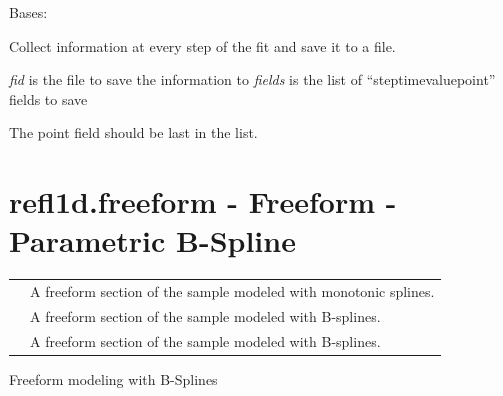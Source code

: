 \documentclass[letterpaper,10pt,english]{sphinxmanual}
\begin{document}

\begin{fulllineitems}
\label{api/fitters:refl1d.fitters.StepMonitor}
Bases: 

Collect information at every step of the fit and save it to a file.

\emph{fid} is the file to save the information to
\emph{fields} is the list of ``step\textbar{}time\textbar{}value\textbar{}point'' fields to save

The point field should be last in the list.

\begin{fulllineitems}
\label{api/fitters:refl1d.fitters.StepMonitor.config_history}
\end{fulllineitems}


\end{fulllineitems}



\section{refl1d.freeform - Freeform - Parametric B-Spline}
\label{api/freeform:refl1d-freeform-freeform-parametric-b-spline}\label{api/freeform::doc}
\begin{tabulary}{\linewidth}{LL}
\hline

{\hyperref[api/freeform:refl1d.freeform.FreeInterface]{}}
 & 
A freeform section of the sample modeled with monotonic splines.
\\

{\hyperref[api/freeform:refl1d.freeform.FreeLayer]{}}
 & 
A freeform section of the sample modeled with B-splines.
\\

{\hyperref[api/freeform:refl1d.freeform.FreeformInterface01]{}}
 & 
A freeform section of the sample modeled with B-splines.
\\
\hline
\end{tabulary}

\label{api/freeform:module-refl1d.freeform}
Freeform modeling with B-Splines
\end{document}
